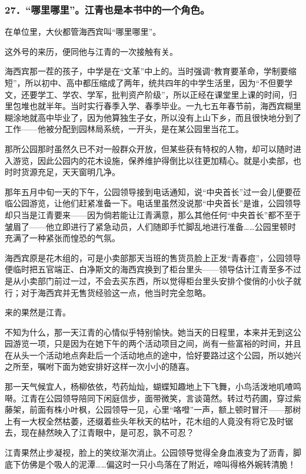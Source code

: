 \subsubsection*{27．“哪里哪里”。江青也是本书中的一个角色。}
\par 在单位里，大伙都管海西宾叫“哪里哪里”。
\par 这外号的来历，便同他与江青的一次接触有关。
\par 海西宾那一茬的孩子，中学是在“文革”中上的。当时强调“教育要革命，学制要缩短”，所以初中、高中都压缩成了两年，统共四年的中学生活里，因为“不但要学文，还要学工、学农、学军，批判资产阶级”，所以正经在课堂里上课的时间，归里包堆也就半年。当时实行春季入学、春季毕业。一九七五年春节前，海西宾糊里糊涂地就高中毕业了，因为他算独生子女，所以没有上山下乡，而且很快地分到了工作——他被分配到园林局系统，一开头，是在某公园里当花工。
\par 那所公园那时虽然久已不对一般群众开放，但某些获有特权的人物，却可以随时进入游览，因此公园内的花木设施，保养维护得倒比以往更加精心。就是小卖部，也时时货源充足，天天窗明几净。
\par 那年五月中旬一天的下午，公园领导接到电话通知，说“中央首长”过一会儿便要莅临公园游览，让他们赶紧准备一下。电话里虽然没说那“中央首长”是谁，公园领导却只当是江青要来——因为倘若能让江青满意，那么其他任何“中央首长”都不至于皱眉了——他立即进行了紧急动员，人们随即手忙脚乱地进行准备……公园里顿时充满了一种紧张而惶恐的气氛。
\par 海西宾原是花木组的，可是小卖部那天当班的售货员脸上正发“青春痘”，公园领导便临时把五官端正、白净斯文的海西宾换到了柜台里头——领导估计江青至多不过是从小卖部门前过一过，不会去买东西，所以觉得柜台里头安排个俊俏的小伙子就行；对于海西宾并无售货经验这一点，他当时完全忽略。
\par 来的果然是江青。
\par 不知为什么，那一天江青的心情似乎特别愉快。她当天的日程里，本来并无到这公园游览一项，只是因为在她下午的两个活动项目之间，尚有一些富裕的时间，并且在从头一个活动地点奔赴后一个活动地点的途中，恰好要路过这个公园，所以她兴之所至，嘱咐下面为她安排好这样一次小小的随喜。
\par 那一天气候宜人，杨柳依依，芍药灿灿，蝴蝶知趣地上下飞舞，小鸟活泼地叽喳鸣啭。江青在公园领导陪同下闲庭信步，面带微笑，言谈蔼然。转过芍药圃，穿过紫藤架，前面有株小叶枫，公园领导一见，心里“咯噔”一声，额上顿时冒汗——那树上有一大杈全然枯萎，还缀着些头年秋天的枯叶，花木组的人竟没有将它及时锯去，现在赫然映入了江青眼中，是可忍，孰不可忍？
\par 江青果然止步凝视，脸上的笑纹渐次消止。公园领导觉得全身血液变为了沥青，脚底下仿佛是个吸人的泥潭……偏这时一只小鸟落在了附近，啼叫得格外婉转清脆！
